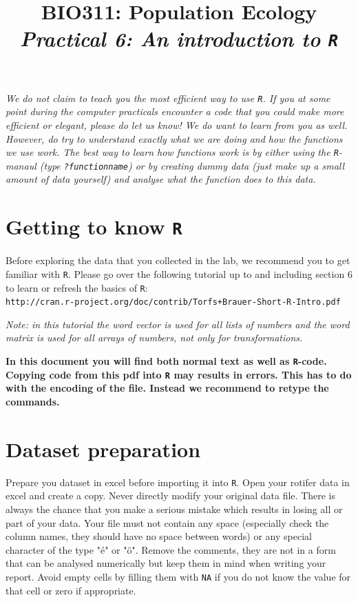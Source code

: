 \documentclass{article}\usepackage[]{graphicx}\usepackage[]{color}
\title{BIO311: Population Ecology\\ \textit{Practical 6: An introduction to \texttt{R}}}
\begin{document}



\maketitle
\tableofcontents
\vspace{3cm}
\begin{mdframed}
\textit{We do not claim to teach you the most efficient way to use \texttt{R}. If you at some point during the computer practicals encounter a code that you could make more efficient or elegant, please do let us know! We do want to learn from you as well.\\[1.5ex] However, do try to understand exactly what we are doing and how the functions we use work. The best way to learn how functions work is by either using the \texttt{R}-manaul (type \texttt{?functionname}) or by creating dummy data (just make up a small amount of data yourself) and analyse what the function does to this data.}
\end{mdframed}
\newpage
\section{Getting to know \texttt{R}}
Before exploring the data that you collected in the lab, we recommend you to get familiar with \texttt{R}. Please go over the following tutorial up to and including section 6 to learn or refresh the basics of \texttt{R}:\\

\texttt{http://cran.r-project.org/doc/contrib/Torfs+Brauer-Short-R-Intro.pdf}
\vspace{1.5ex}

\textit{Note: in this tutorial the word vector is used for all lists of numbers and the word matrix is used for all arrays of numbers, not only for transformations.}

\begin{mdframed}[backgroundcolor=red!40]
\textbf{In this document you will find both normal text as well as \texttt{R}-code. Copying code from this pdf into \texttt{R} may results in errors. This has to do with the encoding of the file. Instead we recommend to retype the commands.}
\end{mdframed}

\section{Dataset preparation}
Prepare you dataset in excel before importing it into \texttt{R}. Open your rotifer data in excel and create a copy. Never directly modify your original data file. There is always the chance that you make a serious mistake which results in losing all or part of your data. Your file must not contain any space (especially check the column names, they should have no space between words) or any special character of the type "\'e" or "\"o". Remove the comments, they are not in a form that can be analysed numerically but keep them in mind when writing your report. Avoid empty cells by filling them with \texttt{NA} if you do not know the value for that cell or zero if appropriate. 
\end{document}
